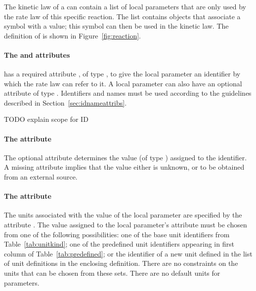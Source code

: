\subsubsection{}
\label{subsec:localparameter}

The kinetic law of a \Reaction can contain a list of local parameters that
are only used by the rate law of this specific reaction. The list contains
\LocalParameter objects that associate a symbol  with a
value; this symbol can then be used in the kinetic law. 
The definition of \LocalParameter is shown in Figure~\vref{fig:reaction}.

\paragraph{The  and  attributes}

\LocalParameter has a required attribute , of type
, to give the local parameter an identifier by which
the rate law can refer to it.  A local
parameter can also have an optional  attribute of type
.  Identifiers and names must be used according
to the guidelines described in Section~\ref{sec:idnameattribs}.

TODO explain scope for ID

\paragraph{The  attribute}

The optional attribute  determines the value (of type
) assigned to the identifier.  A missing
 attribute implies that the value either is unknown, or
to be obtained from an external source.

\paragraph{The  attribute}

The units associated with the value of the local parameter are specified
by the attribute .  The value assigned to
the local parameter's  attribute must be chosen
from one of the following possibilities: one of the base unit
identifiers from Table~\vref{tab:unitkind}; one of the predefined
unit identifiers appearing in first column of
Table~\vref{tab:predefined}; or the identifier of a new unit defined
in the list of unit definitions in the enclosing \Model definition.
There are no constraints on the units that can be chosen from
these sets.  There are no default units for parameters.

